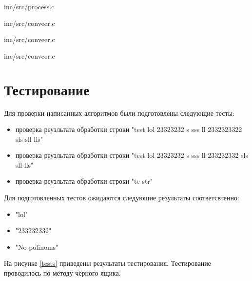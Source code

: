\begin{lstinputlisting}[
	caption={Реализация алгоритма работы главного потока},
	label={Conveyor::process},
	style={c},
	]{inc/src/process.c}
\end{lstinputlisting}

\newpage
\begin{lstinputlisting}[
	caption={Реализация алгоритма первой ленты конвейера},
	label={conveer1},
	style={c},
	linerange={1-25},
	]{inc/src/conveer.c}
\end{lstinputlisting}

\newpage
\begin{lstinputlisting}[
	caption={Реализация алгоритма второй ленты конвейера},
	label={conveer2},
	style={c},
	linerange={27-51},
	]{inc/src/conveer.c}
\end{lstinputlisting}

\newpage
\begin{lstinputlisting}[
	caption={Реализация алгоритма третьей ленты конвейера},
	label={conveer3},
	style={c},
	linerange={53-79},
	]{inc/src/conveer.c}
\end{lstinputlisting}

\section{Тестирование}
Для проверки написанных алгоритмов были подготовлены следующие тесты:
\begin{itemize}
	\item проверка реузльтата обработки строки "test lol 23323232 s sss ll 2332323322 sls sll lls"
	\item проверка реузльтата обработки строки "test lol 23323232 s sss ll 233232332 sls sll lls"
	\item проверка реузльтата обработки строки "te str"
\end{itemize}

Для подготовленных тестов ожидаются следующие результаты соответсвтенно:
\begin{itemize}
	\item "lol"
	\item "233232332"
	\item "No polinoms"
\end{itemize}

На рисунке \ref{tests} приведены результаты тестирования. Тестирование проводилось по методу чёрного ящика.

